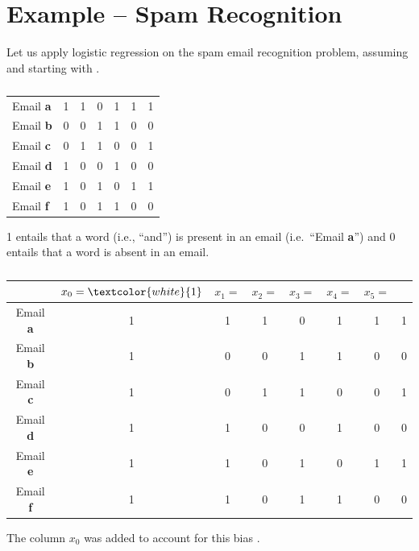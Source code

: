 \documentclass[
	number={4},
	title={Logistic Regression}
]{cs584notes}
\begin{document}
\section{Example -- Spam Recognition}\label{sec:example----spam-recognition}
Let us apply logistic regression on the spam email recognition problem, assuming  and starting with .
\begin{table}[H]
	\centering
	\caption{}
	\label{tab:spam-data}
	\begin{tabular}{*{7}{|C{0.1\textwidth}}|}
		\hline
		 &  &  &  &  &  &  \\
		\hline
		Email \textbf{a} & 1 & 1 & 0 & 1 & 1 & 1\\
		\hline
		Email \textbf{b} & 0 & 0 & 1 & 1 & 0 & 0\\
		\hline
		Email \textbf{c} & 0 & 1 & 1 & 0 & 0 & 1\\
		\hline
		Email \textbf{d} & 1 & 0 & 0 & 1 & 0 & 0\\
		\hline
		Email \textbf{e} & 1 & 0 & 1 & 0 & 1 & 1\\
		\hline
		Email \textbf{f} & 1 & 0 & 1 & 1 & 0 & 0\\
		\hline
	\end{tabular}
\end{table}
1 entails that a word (i.e., ``and'') is present in an email (i.e.\ ``Email \textbf{a}'') and 0 entails that a word is absent in an email.

\begin{table}[H]
	\centering
	\caption{}
	\label{tab:formatted-spam-data}
	\begin{tabular}{*{8}{|c}|}
		\hline
		 & $x_{0} = \textcolor{white}{1}$ & $x_{1} = $  & $x_{2} = $  & $x_{3} = $  & $x_{4} = $  & $x_{5} = $  &  \\
		\hline
		Email \textbf{a} & 1 & 1 & 1 & 0 & 1 & 1 & 1\\
		\hline
		Email \textbf{b} & 1 & 0 & 0 & 1 & 1 & 0 & 0\\
		\hline
		Email \textbf{c} & 1 & 0 & 1 & 1 & 0 & 0 & 1\\
		\hline
		Email \textbf{d} & 1 & 1 & 0 & 0 & 1 & 0 & 0\\
		\hline
		Email \textbf{e} & 1 & 1 & 0 & 1 & 0 & 1 & 1\\
		\hline
		Email \textbf{f} & 1 & 1 & 0 & 1 & 1 & 0 & 0\\
		\hline
	\end{tabular}
\end{table}
The column $x_{0}$ was added to account for this bias .
\end{document}
